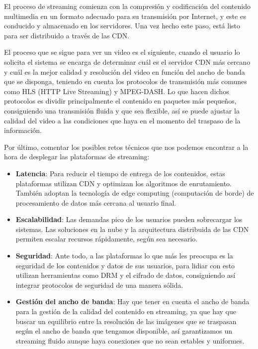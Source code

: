 \documentclass[12pt,a4paper]{article}
\begin{document}
El proceso de streaming comienza con la compresión y codificación del contenido multimedia en un formato adecuado para su transmisión por Internet, y este es conducido y almacenado en los servidores. Una vez hecho este paso, está listo para ser distribuido a través de las CDN.

El proceso que se sigue para ver un video es el siguiente, cuando el usuario lo solicita el sistema se encarga de determinar cuál es el servidor CDN más cercano y cuál es la mejor calidad y resolución del video en función del ancho de banda que se disponga, teniendo en cuenta los protocolos de transmisión más comunes como HLS (HTTP Live Streaming) y MPEG-DASH. Lo que hacen dichos protocolos es dividir principalmente el contenido en paquetes más pequeños, consiguiendo una transmisión fluida y que sea flexible, así se puede ajustar la calidad del video a las condiciones que haya en el momento del traspaso de la información.

Por último, comentar los posibles retos técnicos que nos podemos encontrar a la hora de desplegar las plataformas de streaming:

\begin{itemize}
    \item \textbf{Latencia}: Para reducir el tiempo de entrega de los contenidos, estas plataformas utilizan CDN y optimizan los algoritmos de enrutamiento. También adoptan la tecnología de edge computing (computación de borde) de procesamiento de datos más cercana al usuario final.
    \item \textbf{Escalabilidad}: Las demandas pico de los usuarios pueden sobrecargar los sistemas. Las soluciones en la nube y la arquitectura distribuida de las CDN permiten escalar recursos rápidamente, según sea necesario.
    \item \textbf{Seguridad}: Ante todo, a las plataformas lo que más les preocupa es la seguridad de los contenidos y datos de sus usuarios, para lidiar con esto utilizan herramientas como DRM y el cifrado de datos, consiguiendo así integrar protocolos de seguridad de una manera sólida.
    \item \textbf{Gestión del ancho de banda}: Hay que tener en cuenta el ancho de banda para la gestión de la calidad del contenido en streaming, ya que hay que buscar un equilibrio entre la resolución de las imágenes que se traspasan según el ancho de banda que tengamos disponible, así garantizamos un streaming fluido aunque haya conexiones que no sean estables y uniformes.
\end{itemize}
\end{document}

